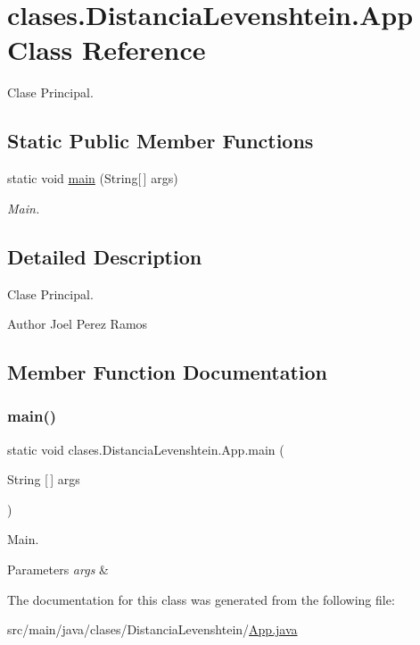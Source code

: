 \hypertarget{classclases_1_1_distancia_levenshtein_1_1_app}{}\section{clases.\+Distancia\+Levenshtein.\+App Class Reference}
\label{classclases_1_1_distancia_levenshtein_1_1_app}


Clase Principal.  


\subsection*{Static Public Member Functions}
\begin{DoxyCompactItemize}
\item 
static void \hyperlink{classclases_1_1_distancia_levenshtein_1_1_app_ac5da9898119949a7134b3a01f98be655}{main} (String\mbox{[}$\,$\mbox{]} args)
\begin{DoxyCompactList}\small\item\em Main. \end{DoxyCompactList}\end{DoxyCompactItemize}


\subsection{Detailed Description}
Clase Principal. 

\begin{DoxyAuthor}{Author}
Joel Perez Ramos 
\end{DoxyAuthor}


\subsection{Member Function Documentation}
\hypertarget{classclases_1_1_distancia_levenshtein_1_1_app_ac5da9898119949a7134b3a01f98be655}{}\label{classclases_1_1_distancia_levenshtein_1_1_app_ac5da9898119949a7134b3a01f98be655} 
\subsubsection{\texorpdfstring{main()}{main()}}
{\footnotesize\ttfamily static void clases.\+Distancia\+Levenshtein.\+App.\+main (\begin{DoxyParamCaption}\item[{String \mbox{[}$\,$\mbox{]}}]{args }\end{DoxyParamCaption})\hspace{0.3cm}{\ttfamily [static]}}



Main. 


\begin{DoxyParams}{Parameters}
{\em args} & \\
\hline
\end{DoxyParams}


The documentation for this class was generated from the following file\+:\begin{DoxyCompactItemize}
\item 
src/main/java/clases/\+Distancia\+Levenshtein/\hyperlink{_app_8java}{App.\+java}\end{DoxyCompactItemize}
